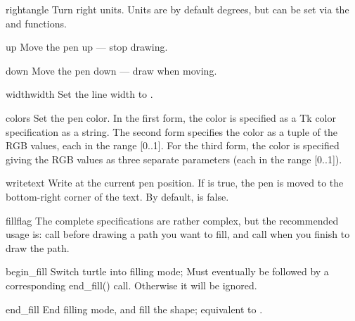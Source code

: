 \begin{funcdesc}{right}{angle}
Turn right  units. Units are by default degrees, but can be
set via the  and  functions.
\end{funcdesc}

\begin{funcdesc}{up}{}
Move the pen up --- stop drawing.
\end{funcdesc}

\begin{funcdesc}{down}{}
Move the pen down --- draw when moving.
\end{funcdesc}

\begin{funcdesc}{width}{width}
Set the line width to .
\end{funcdesc}

\begin{funcdesc}{color}{s}
Set the pen color.  In the first form, the color is specified as a
Tk color specification as a string.  The second form specifies the
color as a tuple of the RGB values, each in the range [0..1].  For the
third form, the color is specified giving the RGB values as three
separate parameters (each in the range [0..1]).
\end{funcdesc}

\begin{funcdesc}{write}{text}
Write  at the current pen position. If  is true,
the pen is moved to the bottom-right corner of the text. By default,
 is false.
\end{funcdesc}

\begin{funcdesc}{fill}{flag}
The complete specifications are rather complex, but the recommended 
usage is: call  before drawing a path you want to fill,
and call  when you finish to draw the path.
\end{funcdesc}

\begin{funcdesc}{begin\_fill}{}
Switch turtle into filling mode; 
Must eventually be followed by a corresponding end_fill() call.
Otherwise it will be ignored.
\end{funcdesc}

\begin{funcdesc}{end\_fill}{}
End filling mode, and fill the shape; equivalent to .
\end{funcdesc}

